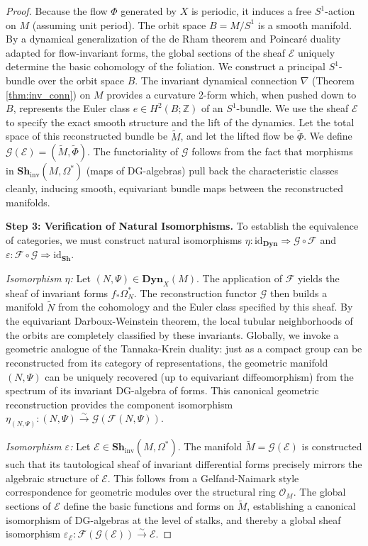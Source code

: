 \begin{proof}
Because the flow $\Phi$ generated by $X$ is periodic, it induces a free $S^1$-action on $M$ (assuming unit period). The orbit space $B = M/S^1$ is a smooth manifold. By a dynamical generalization of the de Rham theorem and Poincaré duality adapted for flow-invariant forms, the global sections of the sheaf $\mathcal{E}$ uniquely determine the basic cohomology of the foliation.
We construct a principal $S^1$-bundle over the orbit space $B$. The invariant dynamical connection $\nabla$ (Theorem \ref{thm:inv_conn}) on $M$ provides a curvature 2-form which, when pushed down to $B$, represents the Euler class $e \in H^2(B; \mathbb{Z})$ of an $S^1$-bundle. We use the sheaf $\mathcal{E}$ to specify the exact smooth structure and the lift of the dynamics. Let the total space of this reconstructed bundle be $\tilde{M}$, and let the lifted flow be $\tilde{\Phi}$. 
We define $\mathcal{G}(\mathcal{E}) = (\tilde{M}, \tilde{\Phi})$. The functoriality of $\mathcal{G}$ follows from the fact that morphisms in $\mathbf{Sh}_{\text{inv}}(M, \Omega^*)$ (maps of DG-algebras) pull back the characteristic classes cleanly, inducing smooth, equivariant bundle maps between the reconstructed manifolds.

\textbf{Step 3: Verification of Natural Isomorphisms.}
To establish the equivalence of categories, we must construct natural isomorphisms $\eta: \text{id}_{\mathbf{Dyn}} \Rightarrow \mathcal{G} \circ \mathcal{F}$ and $\varepsilon: \mathcal{F} \circ \mathcal{G} \Rightarrow \text{id}_{\mathbf{Sh}}$.

\textit{Isomorphism $\eta$:} Let $(N, \Psi) \in \mathbf{Dyn}_X(M)$. The application of $\mathcal{F}$ yields the sheaf of invariant forms $f_* \Omega_N^*$. The reconstruction functor $\mathcal{G}$ then builds a manifold $\tilde{N}$ from the cohomology and the Euler class specified by this sheaf. By the equivariant Darboux-Weinstein theorem, the local tubular neighborhoods of the orbits are completely classified by these invariants. Globally, we invoke a geometric analogue of the Tannaka-Krein duality: just as a compact group can be reconstructed from its category of representations, the geometric manifold $(N, \Psi)$ can be uniquely recovered (up to equivariant diffeomorphism) from the spectrum of its invariant DG-algebra of forms. This canonical geometric reconstruction provides the component isomorphism $\eta_{(N, \Psi)}: (N, \Psi) \xrightarrow{\sim} \mathcal{G}(\mathcal{F}(N, \Psi))$.

\textit{Isomorphism $\varepsilon$:} Let $\mathcal{E} \in \mathbf{Sh}_{\text{inv}}(M, \Omega^*)$. The manifold $\tilde{M} = \mathcal{G}(\mathcal{E})$ is constructed such that its tautological sheaf of invariant differential forms precisely mirrors the algebraic structure of $\mathcal{E}$. This follows from a Gelfand-Naimark style correspondence for geometric modules over the structural ring $\mathcal{O}_M$. The global sections of $\mathcal{E}$ define the basic functions and forms on $\tilde{M}$, establishing a canonical isomorphism of DG-algebras at the level of stalks, and thereby a global sheaf isomorphism $\varepsilon_{\mathcal{E}}: \mathcal{F}(\mathcal{G}(\mathcal{E})) \xrightarrow{\sim} \mathcal{E}$.


\end{proof}
